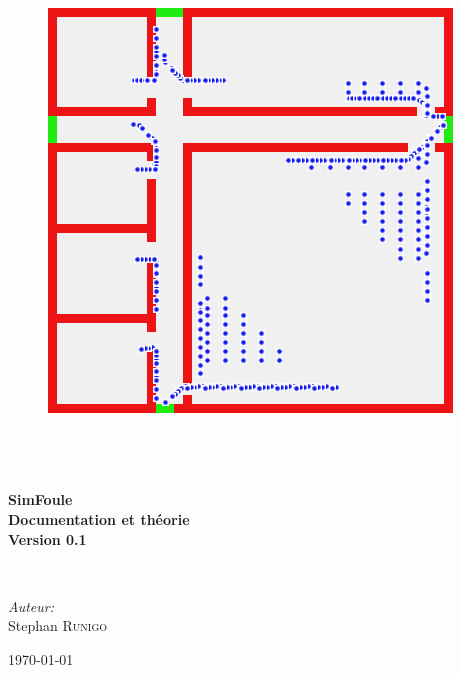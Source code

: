 \begin{titlepage}
\begin{center}
\begin{figure}[htbp]
\begin{minipage}[c]{.45\linewidth}
\begin{center}
\includegraphics[scale=0.45]{./titre/SimFoule0105}
\end{center}
\end{minipage}
\end{figure}
~\\[1cm]

\textsc{\Large }\\[0.5cm]

\HRule \\[0.4cm]

{\huge \bfseries  SimFoule\\[0.2cm] 
Documentation et théorie\\[0.2cm] 
Version 0.1\\[0.4cm] }

\HRule \\[1.5cm]

\begin{minipage}{0.4\textwidth}
\begin{flushleft} \large
\end{flushleft}
\end{minipage}
\begin{minipage}{0.4\textwidth}
\begin{flushright} \large
\emph{Auteur:}\\
Stephan \textsc{Runigo}
\end{flushright}
\end{minipage}

\vfill

{\large \today}

\end{center}
\end{titlepage}
